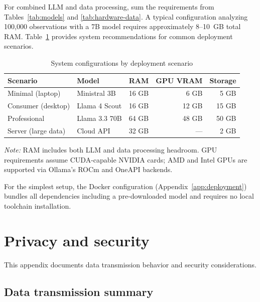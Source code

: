 For combined LLM and data processing, sum the requirements from
Tables~\ref{tab:models} and \ref{tab:hardware-data}. A typical
configuration analyzing 100,000 observations with a 7B model requires
approximately 8--10~GB total RAM. Table~\ref{tab:hardware-summary}
provides system recommendations for common deployment scenarios.

\begin{table}[htbp]
\centering
\begin{threeparttable}
\caption{System configurations by deployment scenario}
\label{tab:hardware-summary}
\small
\begin{tabular}{llrrr}
\toprule
Scenario & Model & RAM & GPU VRAM & Storage \\
\midrule
Minimal (laptop) & Ministral 3B & 16 GB & 6 GB & 5 GB \\
Consumer (desktop) & Llama 4 Scout & 16 GB & 12 GB & 15 GB \\
Professional & Llama 3.3 70B & 64 GB & 48 GB & 50 GB \\
Server (large data) & Cloud API & 32 GB & --- & 2 GB \\
\bottomrule
\end{tabular}
\begin{tablenotes}[flushleft]
\item \emph{Note:} RAM includes both LLM and data processing headroom.
GPU requirements assume CUDA-capable NVIDIA cards; AMD and Intel GPUs
are supported via Ollama's ROCm and OneAPI backends.
\end{tablenotes}
\end{threeparttable}
\end{table}

\noindent For the simplest setup, the Docker configuration
(Appendix~\ref{app:deployment}) bundles all dependencies including
a pre-downloaded model and requires no local toolchain installation.

\section{Privacy and security} \label{app:privacy}
\setcounter{table}{0}
\setcounter{figure}{0}

This appendix documents data transmission behavior and security considerations.

\subsection{Data transmission summary}

